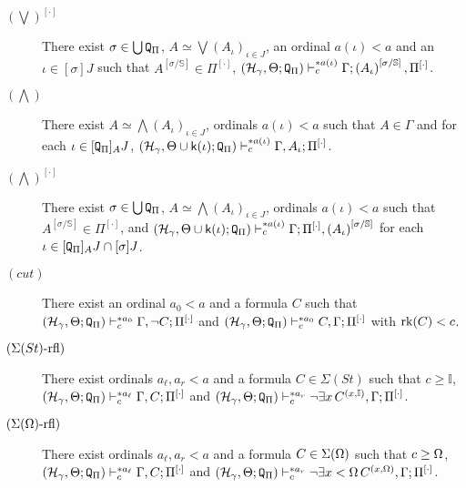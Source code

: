 \documentclass{article}
\newcommand{\mI}{\mathbb{I}}
\begin{document}
{\begin{description}
\item[$(\bigvee)^{[\cdot]}$]
There exist $\sigma\in\bigcup{\tt Q}_{\Pi}$,
$A\simeq\bigvee(A_{\iota})_{\iota\in J}$, an ordinal
$a(\iota)<a$ and an $\iota\in [\sigma] J$ such that 
$A^{[\sigma/\mathbb{S}]}\in\Pi^{[\cdot]}$,
$(\mathcal{H}_{\gamma},\Theta;{\tt Q}_{\Pi})\vdash^{* a(\iota)}_{c}\Gamma;
\left(A_{\iota}\right)^{[\sigma/\mathbb{S}]},\Pi^{[\cdot]}$.

\item[$(\bigwedge)$]
There exist 
$A\simeq\bigwedge(A_{\iota})_{ \iota\in J}$,  ordinals $a(\iota)<a$ such that
$A\in\Gamma$ and
for each $\iota\in [{\tt Q}_{\Pi}]_{A} J$,
$(\mathcal{H}_{\gamma},\Theta\cup{\sf k}(\iota);{\tt Q}_{\Pi}
)
\vdash^{* a(\iota)}_{c}\Gamma,
A_{\iota};\Pi^{[\cdot]}$.


\item[$(\bigwedge)^{[\cdot]}$]
There exist $\sigma\in\bigcup{\tt Q}_{\Pi}$,
$A\simeq\bigwedge(A_{\iota})_{ \iota\in J}$, 
ordinals $a(\iota)<a$ such that
$A^{[\sigma/\mathbb{S}]}\in\Pi^{[\cdot]}$, and
$(\mathcal{H}_{\gamma},\Theta\cup{\sf k}(\iota);{\tt Q}_{\Pi}
)
\vdash^{* a(\iota)}_{c}\Gamma;\Pi^{[\cdot]},\left(A_{\iota}\right)^{[\sigma/\mathbb{S}]}$
for each $\iota\in [{\tt Q}_{\Pi}]_{A}J\cap[\sigma]J$.

\item[$(cut)$]
There exist an ordinal $a_{0}<a$ and a formula $C$
such that 
$(\mathcal{H}_{\gamma},\Theta;{\tt Q}_{\Pi})\vdash^{* a_{0}}_{c}\Gamma,\lnot C;\Pi^{[\cdot]}$
and
$(\mathcal{H}_{\gamma},\Theta;{\tt Q}_{\Pi})\vdash^{* a_{0}}_{c}C,\Gamma;\Pi^{[\cdot]}$
with $\mbox{{\rm rk}}(C)<c$.


\item[$(\Sigma(St)\mbox{{\rm -rfl}})$]
There exist ordinals
$a_{\ell}, a_{r}<a$ and a formula $C\in\Sigma(St)$ 
such that $c\geq\mI$, 
$(\mathcal{H}_{\gamma},\Theta;{\tt Q}_{\Pi}
)\vdash^{* a_{\ell}}_{c}\Gamma,C;\Pi^{[\cdot]}$
and
$(\mathcal{H}_{\gamma},\Theta;{\tt Q}_{\Pi}
)\vdash^{* a_{r}}_{c}
\lnot \exists x\,C^{(x,\mI)}, \Gamma;\Pi^{[\cdot]}$.

\item[$(\Sigma(\Omega)\mbox{{\rm -rfl}})$]
There exist ordinals
$a_{\ell}, a_{r}<a$ and a formula $C\in\Sigma(\Omega)$ 
such that $c\geq\Omega$, 
$(\mathcal{H}_{\gamma},\Theta;{\tt Q}_{\Pi}
)\vdash^{* a_{\ell}}_{c}\Gamma,C;\Pi^{[\cdot]}$
and
$(\mathcal{H}_{\gamma},\Theta;{\tt Q}_{\Pi}
)\vdash^{* a_{r}}_{c}
\lnot \exists x<\Omega\,C^{(x,\Omega)}, \Gamma;\Pi^{[\cdot]}$.



\end{description}}
\end{document}
